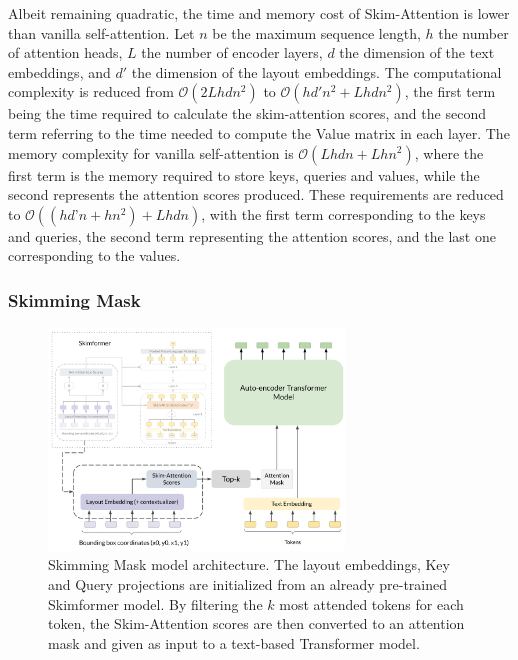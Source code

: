 Albeit remaining quadratic, the time and memory cost of Skim-Attention is lower than vanilla self-attention. Let $n$ be the maximum sequence length, $h$ the number of attention heads, $L$ the number of encoder layers, $d$ the dimension of the text embeddings, and $d'$ the dimension of the layout embeddings. The computational complexity is reduced from $\mathcal{O}(2Lhdn^2)$ to $\mathcal{O}(hd'n^2 + Lhdn^2)$, the first term being the time required to calculate the skim-attention scores, and the second term referring to the time needed to compute the Value matrix in each layer. The memory complexity for vanilla self-attention is $\mathcal{O}(Lhdn + Lhn^2)$, where the first term is the memory required to store keys, queries and values, while the second represents the attention scores produced. These requirements are reduced to $\mathcal{O}((hd’n + hn^2) + Lhdn)$, with the first term corresponding to the keys and queries, the second term representing the attention scores, and the last one corresponding to the values.


\subsubsection{Skimming Mask}

\begin{figure}
    \centering
    \includegraphics[width=0.7\textwidth]{images/chapter3/skimmingmask-architecture.pdf}
    \caption{Skimming Mask model architecture. The layout embeddings, Key and Query projections are initialized from an already pre-trained Skimformer model. By filtering the $k$ most attended tokens for each token, the Skim-Attention scores are then converted to an attention mask and given as input to a text-based Transformer model.}
    \label{fig:chapter3-skimmingmask-architecture}
\end{figure}

